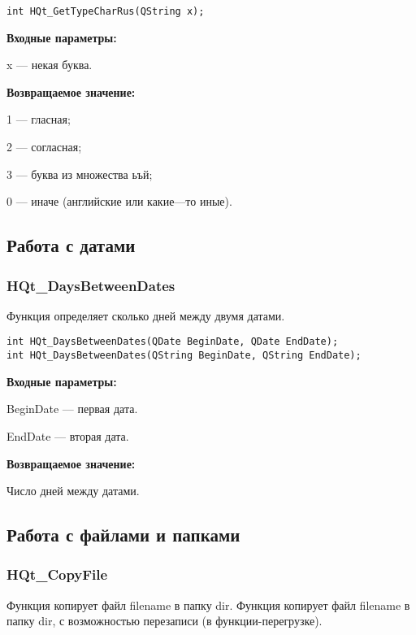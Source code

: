 \documentclass[a4paper,12pt]{article}
\begin{document}
\begin{lstlisting}[label=code_syntax_HQt_GetTypeCharRus,caption=Синтаксис]
int HQt_GetTypeCharRus(QString x);
\end{lstlisting}

\textbf{Входные параметры:}

x --- некая буква.

\textbf{Возвращаемое значение:}

    1 --- гласная;
 
    2 --- согласная;
 
    3 --- буква из множества ьъй;
 
    0 --- иначе (английские или какие---то иные).


\subsection{Работа с датами}

\subsubsection{HQt\_DaysBetweenDates}\label{HQt_DaysBetweenDates}

Функция определяет сколько дней между двумя датами.


\begin{lstlisting}[label=code_syntax_HQt_DaysBetweenDates,caption=Синтаксис]
int HQt_DaysBetweenDates(QDate BeginDate, QDate EndDate);
int HQt_DaysBetweenDates(QString BeginDate, QString EndDate);
\end{lstlisting}

\textbf{Входные параметры:}

BeginDate --- первая дата.

EndDate --- вторая дата.

\textbf{Возвращаемое значение:}

Число дней между датами.


\subsection{Работа с файлами и папками}

\subsubsection{HQt\_CopyFile}\label{HQt_CopyFile}

Функция копирует файл filename в папку dir. Функция копирует файл filename в папку dir, с возможностью перезаписи (в функции-перегрузке).
\end{document}
